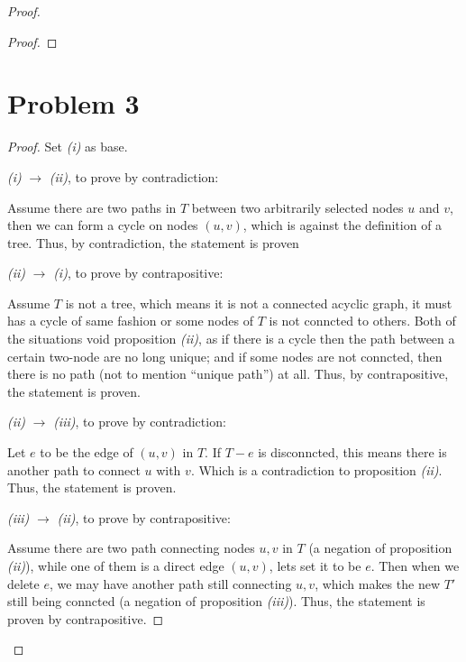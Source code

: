 \documentclass[12pt]{article}
\begin{document}
\begin{proof}
\begin{proof}
\end{proof}


\section{Problem 3}




\begin{proof}

\newline Set \textit{(i)} as base. \newline

\textit{(i)} $\longrightarrow$ \textit{(ii)}, to prove by contradiction:

Assume there are two paths in $T$ between two arbitrarily selected nodes $u$ and $v$, then we can form a cycle on nodes $(u, v)$, which is against the definition of a tree. Thus, by contradiction, the statement is proven \newline

\textit{(ii)} $\longrightarrow$ \textit{(i)}, to prove by contrapositive:

Assume $T$ is not a tree, which means it is not a connected acyclic graph, it must has a cycle of same fashion or some nodes of $T$ is not conncted to others. Both of the situations void proposition \textit{(ii)}, as if there is a cycle then the path between a certain two-node are no long unique; and if some nodes are not conncted, then there is no path (not to mention ``unique path'') at all. Thus, by contrapositive, the statement is proven. \newline

\textit{(ii)} $\longrightarrow$ \textit{(iii)}, to prove by contradiction:

Let $e$ to be the edge of $(u, v)$ in $T$. If $T-e$ is disconncted, this means there is another path to connect $u$ with $v$. Which is a contradiction to proposition \textit{(ii)}. Thus, the statement is proven. \newline

\textit{(iii)} $\longrightarrow$ \textit{(ii)}, to prove by contrapositive:

Assume there are two path connecting nodes $u, v$ in $T$ (a negation of proposition \textit{(ii)}), while one of them is a direct edge $(u, v)$, lets set it to be $e$. Then when we delete $e$, we may have another path still connecting $u, v$, which makes the new $T'$ still being conncted (a negation of proposition \textit{(iii)}). Thus, the statement is proven by contrapositive. \newline


\end{proof}
\end{proof}
\end{document}
